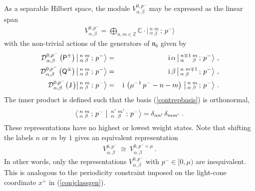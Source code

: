 \documentclass[11pt,a4paper]{article}
\newcommand{\ii}{{\rm i}}
\def\ii{{\,{\rm i}\,}}
\def\P{{\sf P}}
\def\Q{{\sf Q}}
\def\J{{\sf J}}
\newcommand{\complex}{{\mathbb C}} %
\newcommand{\zed}{{\mathbb Z}} %
\def\bea{\begin{eqnarray}}
\def\eea{\end{eqnarray}}
\newcommand{\beq}{\begin{eqnarray}}
\newcommand{\eeq}{\end{eqnarray}}
\begin{document}
As a separable Hilbert space, the module
$V^{0,p^-}_{\alpha,\beta}$ may be expressed as the linear span
\beq
V^{0,p^-}_{\alpha,\beta}=\bigoplus_{n,m\in\zed}\complex\cdot
\bigl|\,{}^n_\alpha\,{}^m_\beta\,;\,p^-\bigr\rangle
\label{contrepbasis}\eeq
with the non-trivial actions of the generators of $\mathfrak{n}_6$
given by
\bea
\mathcal{D}^{0,p^-}_{\alpha,\beta}\left(\P^\pm\right)
\bigl|\,{}^n_\alpha\,{}^m_\beta\,;\,p^-\bigr\rangle
&=&\ii\alpha\,\bigl|\,{}^{n\mp1}_\alpha\,{}^m_\beta\,;\,p^-\bigr\rangle
\ , \nonumber\\\mathcal{D}^{0,p^-}_{\alpha,\beta}\left(\Q^\pm\right)
\bigl|\,{}^n_\alpha\,{}^m_\beta\,;\,p^-\bigr\rangle
&=&\ii\beta\,\bigl|\,{}^n_\alpha\,{}^{m\mp1}_\beta\,;\,p^-\bigr\rangle
\ , \nonumber\\\mathcal{D}^{0,p^-}_{\alpha,\beta}\bigl(\J\,
\bigr)\bigl|\,{}^n_\alpha\,{}^m_\beta\,;\,p^-\bigr\rangle
&=&\ii\left(\mu^{-1}\,p^--n-m\right)\,\bigl|\,{}^n_\alpha\,{}^m_\beta
\,;\,p^-\bigr\rangle \ .
\label{contrepactions}\eea
The inner product is defined such that the basis (\ref{contrepbasis})
is orthonormal,
\beq
\bigl\langle\,{}^n_\alpha\,{}^m_\beta\,;\,p^-\bigm|\,
{}^{n'}_\alpha\,{}^{m'}_\beta\,;\,p^-\bigr\rangle=
\delta_{nn'}\,\delta_{mm'} \ .
\label{contreportho}\eeq
These representations have no highest or lowest weight states. Note
that shifting the labels $n$ or $m$ by $1$ gives an equivalent
representation
\beq
V^{0,p^-}_{\alpha,\beta}~\cong~V^{0,p^-+\mu}_{\alpha,\beta} \ .
\label{contrepinequiv}\eeq
In other words, only the representations $V^{0,p^-}_{\alpha,\beta}$
with $p^-\in[0,\mu)$ are inequivalent. This is analogous to the
periodicity constraint imposed on the light-cone coordinate $x^+$ in
(\ref{conjclassgen}).
\end{document}
